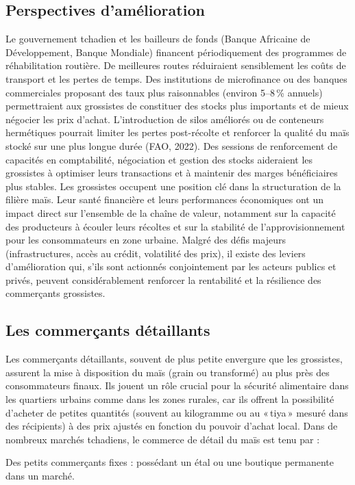\documentclass[12pt,oneside]{report}
\begin{document}
\subsection{Perspectives d’amélioration}
Le gouvernement tchadien et les bailleurs de fonds (Banque Africaine de Développement, Banque Mondiale) financent périodiquement des programmes de réhabilitation routière. De meilleures routes réduiraient sensiblement les coûts de transport et les pertes de temps. Des institutions de microfinance ou des banques commerciales proposant des taux plus raisonnables (environ 5–8 \% annuels) permettraient aux grossistes de constituer des stocks plus importants et de mieux négocier les prix d’achat. L’introduction de silos améliorés ou de conteneurs hermétiques pourrait limiter les pertes post-récolte et renforcer la qualité du maïs stocké sur une plus longue durée (FAO, 2022). Des sessions de renforcement de capacités en comptabilité, négociation et gestion des stocks aideraient les grossistes à optimiser leurs transactions et à maintenir des marges bénéficiaires plus stables. Les grossistes occupent une position clé dans la structuration de la filière maïs. Leur santé financière et leurs performances économiques ont un impact direct sur l’ensemble de la chaîne de valeur, notamment sur la capacité des producteurs à écouler leurs récoltes et sur la stabilité de l’approvisionnement pour les consommateurs en zone urbaine. Malgré des défis majeurs (infrastructures, accès au crédit, volatilité des prix), il existe des leviers d’amélioration qui, s’ils sont actionnés conjointement par les acteurs publics et privés, peuvent considérablement renforcer la rentabilité et la résilience des commerçants grossistes.

\subsection{Les commerçants détaillants}
Les commerçants détaillants, souvent de plus petite envergure que les grossistes, assurent la mise à disposition du maïs (grain ou transformé) au plus près des consommateurs finaux. Ils jouent un rôle crucial pour la sécurité alimentaire dans les quartiers urbains comme dans les zones rurales, car ils offrent la possibilité d’acheter de petites quantités (souvent au kilogramme ou au « tiya » mesuré dans des récipients) à des prix ajustés en fonction du pouvoir d’achat local. Dans de nombreux marchés tchadiens, le commerce de détail du maïs est tenu par :

Des petits commerçants fixes : possédant un étal ou une boutique permanente dans un marché.
\end{document}
